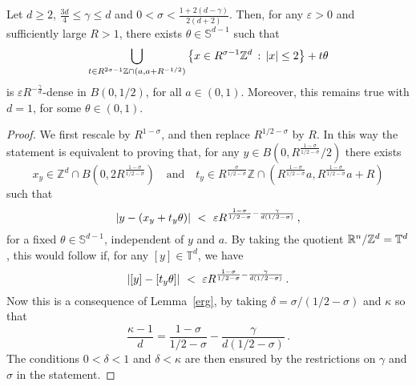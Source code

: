 \documentclass[biblatex]{pzorin-note}
\begin{document}
\begin{corollary}\label{Corollary:ToroImpr}
Let $d\ge 2$, $\frac{3d}{4}\le \gamma \le d$ and $0< \sigma < \frac{1+2(d- \gamma)}{2(d+2)}$.
Then, for any $\varepsilon>0$ and sufficiently large $R >1$,
there exists $\theta \in \mathbb{S}^{d-1}$ such that
\begin{equation*}
\bigcup_{t\in R^{2\sigma-1}\mathbb{Z}\cap(a,a+R^{-1/2})} \big\{x\in R^{\sigma-1} \mathbb{Z}^{d}\, :\, \lvert x\rvert\le 2\big\}+t\theta
\end{equation*}
is $\varepsilon R^{-\frac{\gamma}{d}}$-dense in $B(0,1/2)$, for all $a\in (0,1)$. Moreover, this remains true with $d=1$, for some $\theta\in(0,1)$.
\end{corollary}




\begin{proof}
We first rescale by $R^{1-\sigma}$,
and then replace $R^{1/2-\sigma}$ by $R$. In this way the statement is equivalent to proving that,
for any $y\in B(0,R^{\frac{1-\sigma}{1/2-\sigma}}/2)$ there exists
\[
x_{y} \in \mathbb{Z}^{d}\cap B(0,2R^\frac{1-\sigma}{1/2-\sigma})\quad \text{and}\quad
t_{y}\in R^{\frac{\sigma}{1/2-\sigma}} \mathbb{Z}\cap (R^{\frac{1-\sigma}{1/2-\sigma}}a,R^{\frac{1-\sigma}{1/2-\sigma}}a+R)
\]
such that
\begin{equation*}\label{EquivTorusImpr}
\lvert y - (x_{y} + t_{y}\theta) \rvert\ < \ \varepsilon R^{\frac{1-\sigma}{1/2-\sigma}-\frac{\gamma}{d(1/2-\sigma)}} \, ,
\end{equation*}
for a fixed $\theta \in \mathbb{S}^{d-1}$, independent of $y$ and $a$.
By taking the quotient $\mathbb{R}^n / \mathbb{Z}^{d} = \mathbb{T}^{d}$, this would follow if, for any $[y] \in \mathbb{T}^{d}$, we have
\begin{equation*}
\abs{[y] - [t_{y} \theta]} \ < \ \varepsilon R^{\frac{1-\sigma}{1/2-\sigma}-\frac{\gamma}{d(1/2-\sigma)}} \, .
\end{equation*}
Now this is a consequence of Lemma~\ref{erg}, by taking $\delta=\sigma/(1/2-\sigma)$ and $\kappa$ so that
\[
\frac{\kappa-1}{d}=\frac{1-\sigma}{1/2-\sigma}-\frac{\gamma}{d(1/2-\sigma)} \, .
\]
The conditions $0<\delta<1$ and $\delta < \kappa$ are then ensured by the restrictions on $\gamma$ and
$\sigma$ in the statement.
\end{proof}
\end{document}
